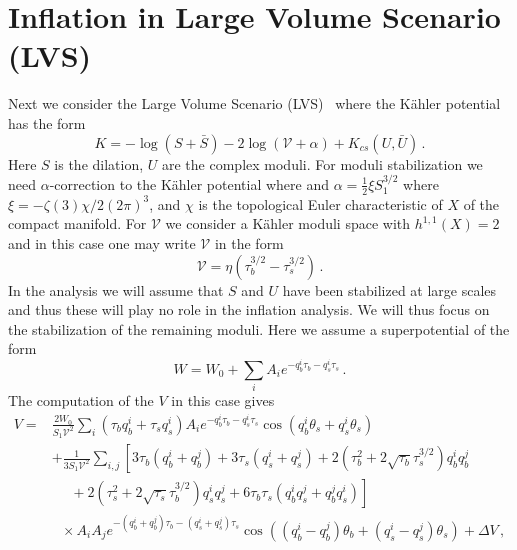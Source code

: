 \documentclass[12pt]{article}
\begin{document}
\section{Inflation in Large Volume Scenario (LVS) \label{sec:LVS}}
Next we consider the Large Volume Scenario (LVS)~\cite{Balasubramanian:2005zx} where the K\"ahler potential has the form
\begin{equation}
  K = - \log\left(S + \bar S\right)
      - 2 \log\left(\mathcal{V} + \alpha\right)
      + K_{cs}\left(U, \bar U\right)\,.
\end{equation}
Here $S$ is the dilation, $U$ are the complex moduli.
For moduli stabilization we need $\alpha$-correction to the K\"ahler potential where and $\alpha = \frac{1}{2} \xi S_1^{3 / 2}$ where $\xi = -\zeta\left(3\right) \chi / 2 \left(2 \pi\right)^3$, and $\chi$ is the topological Euler characteristic of $X$ of the compact manifold.
For $\mathcal{V}$ we consider a K\"ahler moduli space with $h^{1, 1}\left(X\right) = 2$ and in this case one may write $\mathcal{V}$ in the form
\begin{equation}
  \mathcal{V} = \eta \left(\tau_b^{3 / 2} - \tau_s^{3 / 2}\right)\,.
\end{equation}
In the analysis we will assume that $S$ and $U$ have been stabilized at large scales and thus these will play no role in the inflation analysis.
We will thus focus on the stabilization of the remaining moduli.
Here we assume a superpotential of the form
\begin{equation}
  W = W_0 + \sum_i A_i e^{-q^i_b \tau_b - q^i_s \tau_s}\,.
\end{equation}
The computation of the $V$ in this case gives
\begin{equation}
  \begin{aligned}
    V = &\frac{2 W_0}{S_1 \mathcal{V}^2} \sum_i \left(\tau_b q_b^i + \tau_s q_s^i\right)
          A_i e^{-q_b^i \tau_b - q_s^i \tau_s} \cos\left(q_b^i \theta_s + q^i_s \theta_s\right)\\
        & + \frac{1}{3 S_1 \mathcal{V}^2} \sum_{i, j} \left[
              3 \tau_b \left(q^i_b + q^j_b\right)
            + 3 \tau_s \left(q_s^i + q_s^j\right)
            + 2 \left(\tau_b^2 + 2 \sqrt{\tau_b} \tau_s^{3 / 2}\right) q_b^i q_b^j\right.\\
            &~~~~~~ \left.{}
            + 2 \left(\tau^2_s + 2 \sqrt{\tau_s} \tau^{3 / 2}_b\right) q_s^i q_s^j
            + 6 \tau_b \tau_s \left(q_b^i q_s^j + q_b^j q_s^i\right)
        \right]\\
        &~~~ \times A_i A_j
          e^{-\left(q_b^i + q_b^j\right) \tau_b - \left(q_s^i + q_s^j\right) \tau_s}
          \cos\left(
              \left(q_b^i - q_b^j\right) \theta_b
            + \left(q_s^i - q_s^j\right) \theta_s
          \right)
        + \Delta V\,,
  \end{aligned}
\end{equation}
\end{document}
